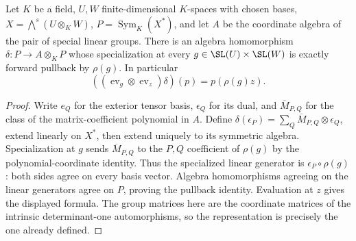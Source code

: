 \begin{lemma}
\label{lem:balanced-plucker-coordinate-pullback}
\leanok
Let $K$ be a field, $U,W$ finite-dimensional $K$-spaces with chosen bases,
$X=\bigwedge^s(U\otimes_K W)$, $P=\operatorname{Sym}_K(X^*)$, and let $A$
be the coordinate algebra of the pair of special linear groups.
There is an algebra homomorphism $\delta:P\to A\otimes_K P$ whose
specialization at every $g\in\SL(U)\times\SL(W)$ is exactly forward
pullback by $\rho(g)$. In particular
\[
 ((\operatorname{ev}_g\otimes\operatorname{ev}_z)\delta)(p)
    =p(\rho(g)z).
\]
\end{lemma}
\begin{proof}
Write $e_Q$ for the exterior tensor basis, $\epsilon_Q$ for its dual,
and $\overline M_{P,Q}$ for the class of the matrix-coefficient polynomial
in $A$. Define
$\delta(\epsilon_P)=\sum_Q\overline M_{P,Q}\otimes\epsilon_Q$,
extend linearly on $X^*$, then extend uniquely to its symmetric algebra.
Specialization at $g$ sends $\overline M_{P,Q}$ to the $P,Q$ coefficient
of $\rho(g)$ by the polynomial-coordinate identity. Thus the specialized
linear generator is $\epsilon_P\circ\rho(g)$: both sides agree on every
basis vector. Algebra homomorphisms agreeing on the linear generators
agree on $P$, proving the pullback identity. Evaluation at $z$ gives the
displayed formula. The group matrices here are the coordinate matrices
of the intrinsic determinant-one automorphisms, so the representation
is precisely the one already defined.
\end{proof}

